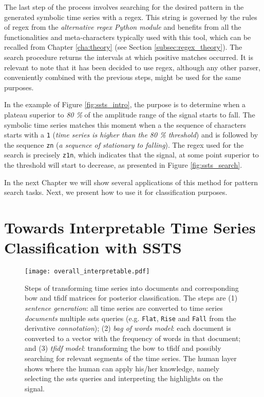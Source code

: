 The last step of the process involves searching for the desired pattern in the generated symbolic time series with a \gls{regex}. This string is governed by the rules of \gls{regex} from the \textit{alternative \gls{regex} Python module} \cite{rgxPy} and benefits from all the functionalities and meta-characters typically used with this tool, which can be recalled from Chapter \ref{cha:theory} (see Section \ref{subsec:regex_theory}). The search procedure returns the intervals at which positive matches occurred. It is relevant to note that it has been decided to use \gls{regex}, although any other parser, conveniently combined with the previous steps, might be used for the same purposes.
\par
In the example of Figure \ref{fig:ssts_intro}, the purpose is to determine when a plateau superior to \textit{80 \%} of the amplitude range of the signal starts to fall. The symbolic time series matches this moment when a the sequence of characters starts with a \texttt{1} (\textit{time series is higher than the 80 \% threshold}) and is followed by  the sequence \texttt{zn} (\textit{a sequence of stationary  to falling}). The \gls{regex} used for the search is precisely \texttt{z1n}, which indicates that the signal, at some point superior to the threshold will start to decrease, as presented in Figure \ref{fig:ssts_search}.
\par
In the next Chapter we will show several applications of this method for pattern search tasks. Next, we present how  to use it for classification purposes.

\section{Towards Interpretable Time Series Classification with SSTS}
\label{sec:hearts}

\begin{figure}[b]
\centering
\texttt{[image: overall\_interpretable.pdf]}
\caption{Steps of transforming time series into documents and corresponding \gls{bow} and \gls{tfidf} matrices for posterior classification. The steps are (1) \textit{sentence generation}: all time series are converted to time series \textit{documents} multiple \gls{ssts} queries (e.g. \texttt{Flat}, \texttt{Rise} and \texttt{Fall} from the derivative \textit{connotation}); (2) \textit{bag of words model}: each document is converted to a vector with the frequency of words in that document; and (3) \textit{tfidf model}: transforming the \gls{bow} to \gls{tfidf} and possibly searching for relevant segments of the time series. The human layer shows where the human can apply his/her knowledge, namely selecting the \gls{ssts} queries and interpreting the highlights on the signal.}
\label{fig:overall_interpretable}
\end{figure}

